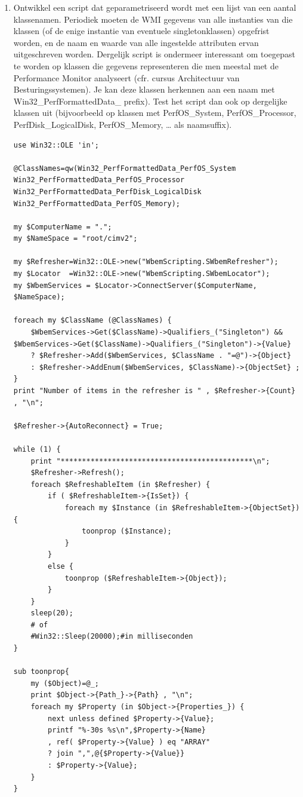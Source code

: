 \documentclass[11pt,a4paper]{report}
\begin{document}
\begin{enumerate}[resume]
	\item Ontwikkel een script dat geparametriseerd wordt met een lijst van een aantal klassenamen. Periodiek moeten de WMI gegevens van alle instanties van die klassen (of de enige instantie van eventuele singletonklassen) opgefrist worden, en de naam en waarde van alle ingestelde attributen ervan uitgeschreven worden. Dergelijk script is ondermeer interessant om toegepast te worden op klassen die gegevens representeren die men meestal met de Performance Monitor analyseert (cfr. cursus Architectuur van Besturingssystemen). Je kan deze klassen herkennen aan een naam met Win32\_PerfFormattedData\_ prefix). Test het script dan ook op dergelijke klassen uit (bijvoorbeeld op klassen met PerfOS\_System, PerfOS\_Processor, PerfDisk\_LogicalDisk, PerfOS\_Memory, … als naamsuffix).
	\begin{lstlisting}
use Win32::OLE 'in';

@ClassNames=qw(Win32_PerfFormattedData_PerfOS_System Win32_PerfFormattedData_PerfOS_Processor Win32_PerfFormattedData_PerfDisk_LogicalDisk Win32_PerfFormattedData_PerfOS_Memory);

my $ComputerName = ".";
my $NameSpace = "root/cimv2";

my $Refresher=Win32::OLE->new("WbemScripting.SWbemRefresher");
my $Locator  =Win32::OLE->new("WbemScripting.SWbemLocator");
my $WbemServices = $Locator->ConnectServer($ComputerName, $NameSpace);

foreach my $ClassName (@ClassNames) {
	$WbemServices->Get($ClassName)->Qualifiers_("Singleton") && $WbemServices->Get($ClassName)->Qualifiers_("Singleton")->{Value}
	? $Refresher->Add($WbemServices, $ClassName . "=@")->{Object}
	: $Refresher->AddEnum($WbemServices, $ClassName)->{ObjectSet} ;
}
print "Number of items in the refresher is " , $Refresher->{Count} , "\n";

$Refresher->{AutoReconnect} = True;

while (1) {
	print "*********************************************\n";
	$Refresher->Refresh();
	foreach $RefreshableItem (in $Refresher) {
		if ( $RefreshableItem->{IsSet}) {
			foreach my $Instance (in $RefreshableItem->{ObjectSet}) {
				toonprop ($Instance);
			}
		}
		else {
			toonprop ($RefreshableItem->{Object});
		}
	}
	sleep(20);
	# of
	#Win32::Sleep(20000);#in milliseconden
}

sub toonprop{
	my ($Object)=@_;
	print $Object->{Path_}->{Path} , "\n";
	foreach my $Property (in $Object->{Properties_}) {
		next unless defined $Property->{Value};
		printf "%-30s %s\n",$Property->{Name}
		, ref( $Property->{Value} ) eq "ARRAY"
		? join ",",@{$Property->{Value}}
		: $Property->{Value};
	}
}
	\end{lstlisting}
\end{enumerate}
\end{document}
